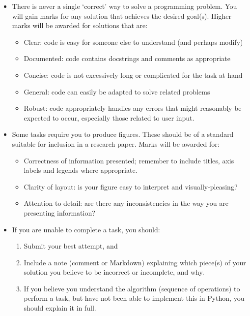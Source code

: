 \documentclass[11pt]{article}
\providecommand{\tightlist}{%
      \setlength{\itemsep}{0pt}\setlength{\parskip}{0pt}}
\begin{document}
\begin{itemize}
\item
  There is never a single `correct' way to solve a programming problem.
  You will gain marks for any solution that achieves the desired
  goal(s). Higher marks will be awarded for solutions that are:

  \begin{itemize}
  \tightlist
  \item
    Clear: code is easy for someone else to understand (and perhaps
    modify)
  \item
    Documented: code contains docstrings and comments as appropriate
  \item
    Concise: code is not excessively long or complicated for the task at
    hand
  \item
    General: code can easily be adapted to solve related problems
  \item
    Robust: code appropriately handles any errors that might reasonably
    be expected to occur, especially those related to user input.
  \end{itemize}
\item
  Some tasks require you to produce figures. These should be of a
  standard suitable for inclusion in a research paper. Marks will be
  awarded for:

  \begin{itemize}
  \tightlist
  \item
    Correctness of information presented; remember to include titles,
    axis labels and legends where appropriate.
  \item
    Clarity of layout: is your figure easy to interpret and
    visually-pleasing?
  \item
    Attention to detail: are there any inconsistencies in the way you
    are presenting information?
  \end{itemize}
\item
  If you are unable to complete a task, you should:

  \begin{enumerate}
  \def\labelenumi{\arabic{enumi}.}
  \tightlist
  \item
    Submit your best attempt, and
  \item
    Include a note (comment or Markdown) explaining which piece(s) of
    your solution you believe to be incorrect or incomplete, and why.
  \item
    If you believe you understand the algorithm (sequence of operations)
    to perform a task, but have not been able to implement this in
    Python, you should explain it in full.
  \end{enumerate}


\end{itemize}
\end{document}
